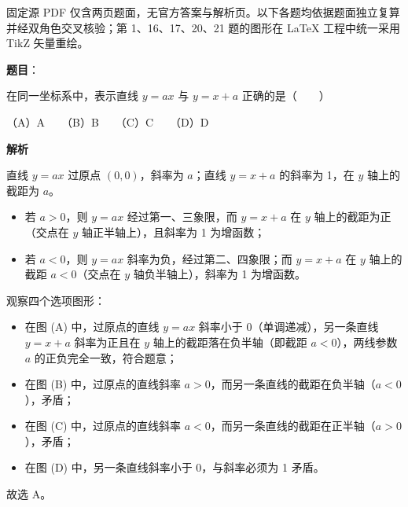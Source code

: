 

\begin{gktip}
固定源 PDF 仅含两页题面，无官方答案与解析页。以下各题均依据题面独立复算并经双角色交叉核验；第 1、16、17、20、21 题的图形在 LaTeX 工程中统一采用 TikZ 矢量重绘。
\end{gktip}

\begin{answer}

\textbf{题目}：

在同一坐标系中，表示直线 $y = ax$ 与 $y = x + a$ 正确的是\mbox{（　　）}
\nopagebreak[4]
\begin{center}\end{center}
\nopagebreak[4]
（A）A　　（B）B　　（C）C　　（D）D

\textbf{解析}

直线 $y = ax$ 过原点 $(0, 0)$，斜率为 $a$；直线 $y = x + a$ 的斜率为 1，在 $y$ 轴上的截距为 $a$。
\begin{itemize}
\item 若 $a > 0$，则 $y = ax$ 经过第一、三象限，而 $y = x + a$ 在 $y$ 轴上的截距为正（交点在 $y$ 轴正半轴上），且斜率为 1 为增函数；
\item 若 $a < 0$，则 $y = ax$ 斜率为负，经过第二、四象限；而 $y = x + a$ 在 $y$ 轴上的截距 $a < 0$（交点在 $y$ 轴负半轴上），斜率为 1 为增函数。
\end{itemize}

观察四个选项图形：
\begin{itemize}
\item 在图 (A) 中，过原点的直线 $y = ax$ 斜率小于 0（单调递减），另一条直线 $y = x + a$ 斜率为正且在 $y$ 轴上的截距落在负半轴（即截距 $a < 0$），两线参数 $a$ 的正负完全一致，符合题意；
\item 在图 (B) 中，过原点的直线斜率 $a > 0$，而另一条直线的截距在负半轴（$a < 0$），矛盾；
\item 在图 (C) 中，过原点的直线斜率 $a < 0$，而另一条直线的截距在正半轴（$a > 0$），矛盾；
\item 在图 (D) 中，另一条直线斜率小于 0，与斜率必须为 1 矛盾。
\end{itemize}

故选 A。


\end{answer}
